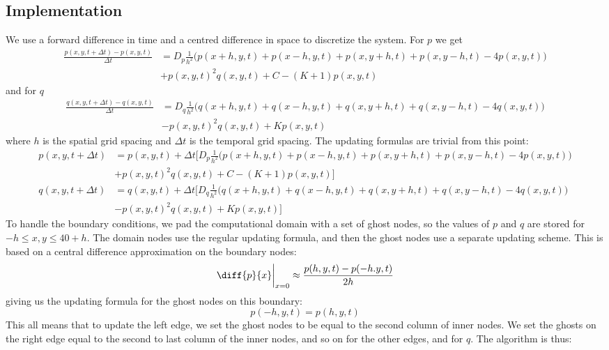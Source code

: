 \documentclass[a4paper,10pt]{article}
\begin{document}
	\subsection*{Implementation}
	We use a forward difference in time and a centred difference in space to discretize the system. For $ p $ we get
	\begin{align*}
		\frac{p(x, y, t+\Delta t) - p(x,y,t)}{\Delta t} &= D_p \frac{1}{h^2}\Big(p(x+h, y, t) + p(x-h, y, t) + p(x, y+h, t) + p(x, y-h, t) - 4p(x, y, t)\Big) \\
		&+ p(x,y,t)^2q(x,y,t) + C - (K+1) p(x,y,t)
	\end{align*}
	and for $ q $
	\begin{align*}
		\frac{q(x, y, t+\Delta t) - q(x,y,t)}{\Delta t} &= D_q \frac{1}{h^2}\Big(q(x+h, y, t) +q(x-h, y, t) + q(x, y+h, t) + q(x, y-h, t) - 4q(x, y, t)\Big) \\
		&- p(x,y,t)^2q(x,y,t) +K p(x,y,t)
	\end{align*}
	where $ h $ is the spatial grid spacing and $ \Delta t $ is the temporal grid spacing. The updating formulas are trivial from this point:
	\begin{align}
	p(x,y,t+\Delta t) &=p(x,y,t) + \Delta t \bigg[ D_p \frac{1}{h^2}\Big(p(x+h, y, t) + p(x-h, y, t) + p(x, y+h, t) + p(x, y-h, t) - 4p(x, y, t)\Big) \nonumber \\
	&+ p(x,y,t)^2q(x,y,t) + C - (K+1) p(x,y,t)\bigg] \label{eq:p_update}\\
	q(x,y,t+\Delta t) &=q(x,y,t) + \Delta t \bigg[ D_q \frac{1}{h^2}\Big(q(x+h, y, t) +q(x-h, y, t) + q(x, y+h, t) + q(x, y-h, t) - 4q(x, y, t)\Big) \nonumber\\
	&- p(x,y,t)^2q(x,y,t) +K p(x,y,t) \bigg] \label{eq:q_update}
	\end{align}
	To handle the boundary conditions, we pad the computational domain with a set of ghost nodes, so the values of $ p $ and $ q $ are stored for $ -h \leq x,y \leq 40+h $. The domain nodes use the regular updating formula, and then the ghost nodes use a separate updating scheme. This is based on a central difference approximation on the boundary nodes:
	\begin{equation}
		\diff{p}{x}\bigg|_{x=0} \approx \frac{p(h, y, t) - p(-h. y, t)}{2h} 
	\end{equation}
	giving us the updating formula for the ghost nodes on this boundary:
	\begin{equation}\label{eq:ghosts}
		p(-h,y,t) = p(h,y,t)
	\end{equation}
	This all means that to update the left edge, we set the ghost nodes to be equal to the second column of inner nodes. We set the ghosts on the right edge equal to the second to last column of the inner nodes, and so on for the other edges, and for $ q $. The algorithm is thus:
\end{document}
